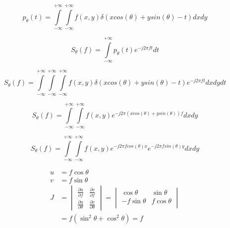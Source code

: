 \documentclass[journal, onecolumn, 11pt]{IEEEtran}
\begin{document}
\begin{equation}
    p_{\theta}(t) = \int\limits_{-\infty}^{+\infty}\int\limits_{-\infty}^{+\infty}f(x,y)\delta(xcos(\theta)+ysin(\theta)-t) dx dy
\end{equation}




\begin{equation}
    S_{\theta}(f) = \int\limits_{-\infty}^{+\infty}p_{\theta}(t)e^{-j2\pi ft}dt
\end{equation}

\begin{equation}
    S_{\theta}(f) = \int\limits_{-\infty}^{+\infty}\int\limits_{-\infty}^{+\infty}\int\limits_{-\infty}^{+\infty}f(x,y)\delta(xcos(\theta)+ysin(\theta)-t) e^{-j2\pi ft} dx dy dt
\end{equation}

\begin{equation}
    S_{\theta}(f) = \int\limits_{-\infty}^{+\infty}\int\limits_{-\infty}^{+\infty}f(x,y)e^{-j2\pi \left(xcos(\theta)+ysin(\theta)\right)f}dxdy
\end{equation}

\begin{equation}
    S_{\theta}(f) = \int\limits_{-\infty}^{+\infty}\int\limits_{-\infty}^{+\infty}f(x,y)e^{-j2\pi fcos(\theta) x}e^{-j2\pi fsin(\theta) y}dxdy
\end{equation}

\begin{align}
	u &= f \cos\theta \\
	v &= f \sin\theta \\
	J &= \begin{vmatrix}
		\frac{\partial u}{\partial f} & \frac{\partial v}{\partial f} \\ 
		\frac{\partial u}{\partial \theta} & \frac{\partial v}{\partial \theta} 
	\end{vmatrix} = \begin{vmatrix}
		\cos\theta & \sin\theta \\ 
		-f\sin\theta & f\cos\theta \\
	\end{vmatrix} \\
	&= f(\sin^2\theta + \cos^2\theta) = f
	\end{align}
\end{document}
